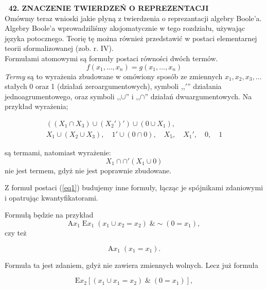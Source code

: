 \documentclass[b5paper,8 pt,leqno]{book}
\begin{document}
\normalsize
\textbf{\textsection \, 42. ZNACZENIE TWIERDZEŃ O REPREZENTACJI} \\
\indent Omówmy teraz wnioski jakie płyną z twierdzenia o reprezantacji algebry Boole'a. \\
\indent Algebry Boole'a wprowadziliśmy aksjomatycznie w  tego rozdziału, używając języka potocznego. Teorię tę można również przedstawić w postaci elementarnej teorii sformalizowanej (zob. r. IV). \\
\indent Formułami atomowymi są formuły postaci równości dwóch termów.
\begin{equation}
f(x_1, \dots, x_n) = g(x_1, \dots, x_n)
\label{eq1}
\end{equation}
\textit{Termy} są to wyrażenia zbudowane w omówiony sposób ze zmiennych $x_1, x_2, x_3, \dots$ stałych 0 oraz 1 (działań zeroargumentowych), symboli ,,$'$'' działania jednoagrumentowego, oraz symboli ,,$\cup$'' i ,,$\cap$'' działań dwuargumentowych. Na przykład wyrażenia;

\begin{gather*}
\left( (X_1 \cap X_3) \cup (X_2')'\right) \cup (0 \cup X_1),\\
X_1 \cup (X_2 \cup X_3), \quad 1'\cup(0 \cap 0), \quad X_5, \quad X_1', \quad 0, \quad 1 
\end{gather*}

są termami, natomiast wyrażenie:
\begin{equation*}
X_1 \cap \cap '(X_1\cup 0)
\end{equation*}
nie jest termem, gdyż nie jest poprawnie zbudowane.

\indent Z formuł postaci (\ref{eq1}) budujemy inne formuły, łącząc je spójnikami zdaniowymi i opatrując kwantyfikatorami.

\indent Formułą będzie na przykład
\begin{equation*}
\textrm{A}x_1 \; \textrm{E}x_1 \; (x_1 \cup x_2 = x_2) \; \& \sim (0 = x_1),
\end{equation*}
czy też

\begin{equation*}
\textrm{A}x_1 \; (x_1 = x_1).
\end{equation*}

Formuła ta jest zdaniem, gdyż nie zawiera zmiennych wolnych. Lecz już formuła

\begin{equation*}
\textrm{E}x_2[(x_1 \cup x_1 = x_2) \; \& \; (0=x_1)],
\end{equation*}
\end{document}
